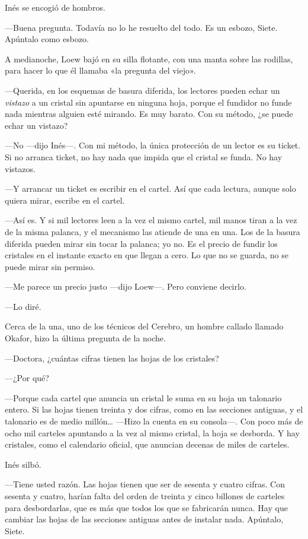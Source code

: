 Inés se encogió de hombros.

---Buena pregunta. Todavía no lo he resuelto del todo. Es un esbozo, Siete. Apúntalo como esbozo.

\escena
A medianoche, Loew bajó en su silla flotante, con una manta sobre las rodillas, para hacer lo que él llamaba «la pregunta del viejo».

---Querida, en los esquemas de basura diferida, los lectores pueden echar un \emph{vistazo} a un cristal sin apuntarse en ninguna hoja, porque el fundidor no funde nada mientras alguien esté mirando. Es muy barato. Con su método, ¿se puede echar un vistazo?

---No ---dijo Inés---\nobreak. Con mi método, la única protección de un lector es su ticket. Si no arranca ticket, no hay nada que impida que el cristal se funda. No hay vistazos.

---Y arrancar un ticket es escribir en el cartel. Así que cada lectura, aunque solo quiera mirar, escribe en el cartel.

---Así es. Y si mil lectores leen a la vez el mismo cartel, mil manos tiran a la vez de la misma palanca, y el mecanismo las atiende de una en una. Los de la basura diferida pueden mirar sin tocar la palanca; yo no. Es el precio de fundir los cristales en el instante exacto en que llegan a cero. Lo que no se guarda, no se puede mirar sin permiso.

---Me parece un precio justo ---dijo Loew---\nobreak. Pero conviene decirlo.

---Lo diré.

\escena
Cerca de la una, uno de los técnicos del Cerebro, un hombre callado llamado Okafor, hizo la última pregunta de la noche.

---Doctora, ¿cuántas cifras tienen las hojas de los cristales?

---¿Por qué?

---Porque cada cartel que anuncia un cristal le suma en su hoja un talonario entero. Si las hojas tienen treinta y dos cifras, como en las secciones antiguas, y el talonario es de medio millón\ldots{} ---Hizo la cuenta en su consola---\nobreak. Con poco más de ocho mil carteles apuntando a la vez al mismo cristal, la hoja se desborda. Y hay cristales, como el calendario oficial, que anuncian decenas de miles de carteles.

Inés silbó.

---Tiene usted razón. Las hojas tienen que ser de sesenta y cuatro cifras. Con sesenta y cuatro, harían falta del orden de treinta y cinco billones de carteles para desbordarlas, que es más que todos los que se fabricarán nunca. Hay que cambiar las hojas de las secciones antiguas antes de instalar nada. Apúntalo, Siete.

